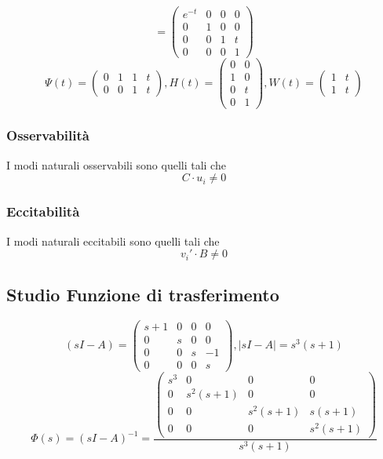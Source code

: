 \documentclass{article}
\begin{document}
\[ = \left(\begin{matrix}e^{- t} & 0 & 0 & 0\\0 & 1 & 0 & 0\\0 & 0 & 1 & t\\0 & 0 & 0 & 1\end{matrix}\right) \]\[ \Psi(t) = \left(\begin{matrix}0 & 1 & 1 & t\\0 & 0 & 1 & t\end{matrix}\right), H(t) =  \left(\begin{matrix}0 & 0\\1 & 0\\0 & t\\0 & 1\end{matrix}\right),W(t) = \left(\begin{matrix}1 & t\\1 & t\end{matrix}\right)\]\subsubsection{Osservabilità}
 I modi naturali osservabili sono quelli tali che 
\[ C \cdot u_i   \neq 0\]
\subsubsection{Eccitabilità}
 I modi naturali eccitabili sono quelli tali che 
\[v_i' \cdot B \neq 0\]

\subsection{Studio Funzione di trasferimento}

\[ (sI-A) = \left(\begin{matrix}s + 1 & 0 & 0 & 0\\0 & s & 0 & 0\\0 & 0 & s & -1\\0 & 0 & 0 & s\end{matrix}\right), |sI-A| = s^{3} \left(s + 1\right) \]
\[ \Phi(s) = (sI-A)^{-1} = \frac{\left(\begin{matrix}s^{3} & 0 & 0 & 0\\0 & s^{2} \left(s + 1\right) & 0 & 0\\0 & 0 & s^{2} \left(s + 1\right) & s \left(s + 1\right)\\0 & 0 & 0 & s^{2} \left(s + 1\right)\end{matrix}\right)}{s^{3} \left(s + 1\right)} \]
\end{document}
